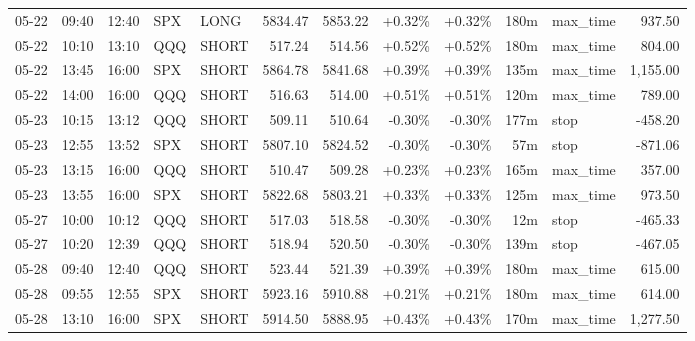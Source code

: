 \documentclass[11pt,a4paper,twoside]{article}
\begin{document}
\begin{center}
\begin{longtable}{>{\color{txtmain}}l l l l l r r r r r >{\color{txtmain}}l r}
05-22 & 09:40 & 12:40 & SPX & LONG & 5834.47 & 5853.22 & \textcolor{wingreen}{+0.32\%} & \textcolor{wingreen}{+0.32\%} & 180m & max\_time & \textcolor{wingreen}{937.50} \\
05-22 & 10:10 & 13:10 & QQQ & SHORT & 517.24 & 514.56 & \textcolor{wingreen}{+0.52\%} & \textcolor{wingreen}{+0.52\%} & 180m & max\_time & \textcolor{wingreen}{804.00} \\
05-22 & 13:45 & 16:00 & SPX & SHORT & 5864.78 & 5841.68 & \textcolor{wingreen}{+0.39\%} & \textcolor{wingreen}{+0.39\%} & 135m & max\_time & \textcolor{wingreen}{1,155.00} \\
05-22 & 14:00 & 16:00 & QQQ & SHORT & 516.63 & 514.00 & \textcolor{wingreen}{+0.51\%} & \textcolor{wingreen}{+0.51\%} & 120m & max\_time & \textcolor{wingreen}{789.00} \\
05-23 & 10:15 & 13:12 & QQQ & SHORT & 509.11 & 510.64 & \textcolor{lossred}{-0.30\%} & \textcolor{lossred}{-0.30\%} & 177m & stop & \textcolor{lossred}{-458.20} \\
05-23 & 12:55 & 13:52 & SPX & SHORT & 5807.10 & 5824.52 & \textcolor{lossred}{-0.30\%} & \textcolor{lossred}{-0.30\%} & 57m & stop & \textcolor{lossred}{-871.06} \\
05-23 & 13:15 & 16:00 & QQQ & SHORT & 510.47 & 509.28 & \textcolor{wingreen}{+0.23\%} & \textcolor{wingreen}{+0.23\%} & 165m & max\_time & \textcolor{wingreen}{357.00} \\
05-23 & 13:55 & 16:00 & SPX & SHORT & 5822.68 & 5803.21 & \textcolor{wingreen}{+0.33\%} & \textcolor{wingreen}{+0.33\%} & 125m & max\_time & \textcolor{wingreen}{973.50} \\
05-27 & 10:00 & 10:12 & QQQ & SHORT & 517.03 & 518.58 & \textcolor{lossred}{-0.30\%} & \textcolor{lossred}{-0.30\%} & 12m & stop & \textcolor{lossred}{-465.33} \\
05-27 & 10:20 & 12:39 & QQQ & SHORT & 518.94 & 520.50 & \textcolor{lossred}{-0.30\%} & \textcolor{lossred}{-0.30\%} & 139m & stop & \textcolor{lossred}{-467.05} \\
05-28 & 09:40 & 12:40 & QQQ & SHORT & 523.44 & 521.39 & \textcolor{wingreen}{+0.39\%} & \textcolor{wingreen}{+0.39\%} & 180m & max\_time & \textcolor{wingreen}{615.00} \\
05-28 & 09:55 & 12:55 & SPX & SHORT & 5923.16 & 5910.88 & \textcolor{wingreen}{+0.21\%} & \textcolor{wingreen}{+0.21\%} & 180m & max\_time & \textcolor{wingreen}{614.00} \\
05-28 & 13:10 & 16:00 & SPX & SHORT & 5914.50 & 5888.95 & \textcolor{wingreen}{+0.43\%} & \textcolor{wingreen}{+0.43\%} & 170m & max\_time & \textcolor{wingreen}{1,277.50} \\

\end{longtable}
\end{center}
\end{document}
